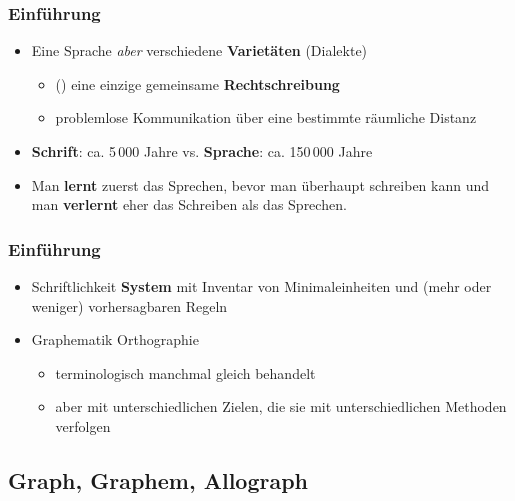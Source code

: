 \begin{frame}
\frametitle{Einführung}

\begin{itemize}
	\item Eine Sprache \emph{aber} verschiedene \textbf{Varietäten} (Dialekte)
	
	\begin{itemize}
		\item (\idR) eine einzige gemeinsame \textbf{Rechtschreibung}

		\item problemlose Kommunikation über eine bestimmte räumliche Distanz	

	\end{itemize}

\pause

	\item \textbf{Schrift}: ca. 5\,000 Jahre vs. \textbf{Sprache}: ca. 150\,000 Jahre

	\item Man \textbf{lernt} zuerst das Sprechen, bevor man überhaupt schreiben kann und man \textbf{verlernt} eher das Schreiben als das Sprechen.
\end{itemize}

\end{frame}


\begin{frame}
\frametitle{Einführung}

\begin{itemize}
	 \item Schriftlichkeit \ras \textbf{System} mit Inventar von Minimaleinheiten und (mehr oder weniger) vorhersagbaren Regeln

	 \item Graphematik \vs Orthographie
	 
	 \begin{itemize}
	 	\item terminologisch manchmal gleich behandelt

	 	\item aber mit unterschiedlichen Zielen, die sie mit unterschiedlichen Methoden verfolgen
	 \end{itemize}
\end{itemize}

\end{frame}


\subsection{Graph, Graphem, Allograph}

